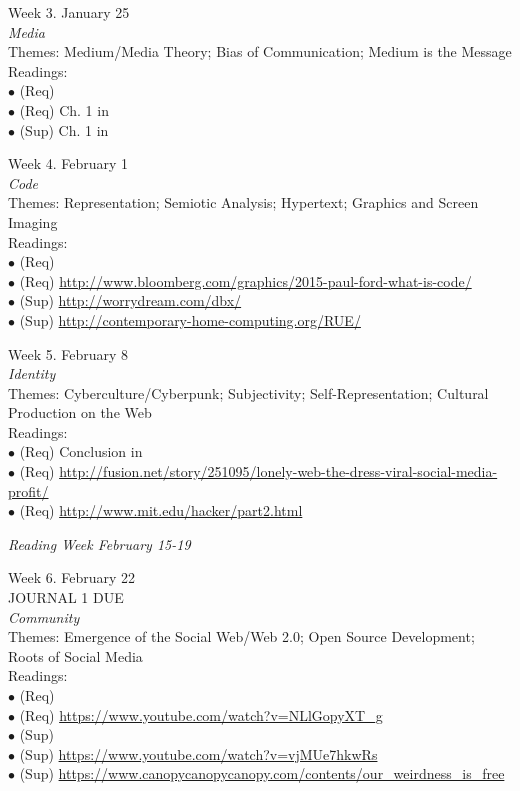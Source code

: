\documentclass[10pt]{article}
\begin{document}
Week 3. January 25 \\
\textit{Media} \\
Themes: Medium/Media Theory; Bias of Communication; Medium is the Message \\
	Readings: \\ 
	$\bullet$ (Req) \\
	$\bullet$ (Req) Ch. 1 in \\
	$\bullet$ (Sup) Ch. 1 in 

Week 4. February 1 \\
\textit{Code} \\
Themes: Representation; Semiotic Analysis; Hypertext; Graphics and Screen Imaging \\ 
	Readings: \\
	$\bullet$ (Req) \\
	$\bullet$ (Req) \url{http://www.bloomberg.com/graphics/2015-paul-ford-what-is-code/}\\
	$\bullet$ (Sup) \url{http://worrydream.com/dbx/}\\
	$\bullet$ (Sup) \url{http://contemporary-home-computing.org/RUE/}

Week 5. February 8 \\
\textit{Identity} \\
Themes: Cyberculture/Cyberpunk; Subjectivity; Self-Representation; Cultural Production on the Web \\ 
	Readings: \\
	$\bullet$ (Req) Conclusion in \\
	$\bullet$ (Req) \url{http://fusion.net/story/251095/lonely-web-the-dress-viral-social-media-profit/}\\
	$\bullet$ (Req) \url{http://www.mit.edu/hacker/part2.html}

\textit{Reading Week February 15-19}

Week 6. February 22 \\
JOURNAL 1 DUE \\
\textit{Community} \\
Themes: Emergence of the Social Web/Web 2.0; Open Source Development; Roots of Social Media \\
	Readings: \\
	$\bullet$ (Req) \\
	$\bullet$ (Req) \url{https://www.youtube.com/watch?v=NLlGopyXT_g}\\
	$\bullet$ (Sup) \\
	$\bullet$ (Sup) \url{https://www.youtube.com/watch?v=vjMUe7hkwRs}\\
	$\bullet$ (Sup) \url{https://www.canopycanopycanopy.com/contents/our_weirdness_is_free}
\end{document}
